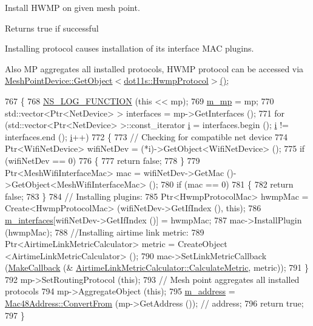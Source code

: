 Install H\+W\+MP on given mesh point. 

\begin{DoxyReturn}{Returns}
true if successful
\end{DoxyReturn}
Installing protocol causes installation of its interface M\+AC plugins.

Also MP aggregates all installed protocols, H\+W\+MP protocol can be accessed via \hyperlink{classns3_1_1Object_a13e18c00017096c8381eb651d5bd0783}{Mesh\+Point\+Device\+::\+Get\+Object$<$dot11s\+::\+Hwmp\+Protocol$>$()}; 
\begin{DoxyCode}
767 \{
768   \hyperlink{log-macros-disabled_8h_a90b90d5bad1f39cb1b64923ea94c0761}{NS\_LOG\_FUNCTION} (\textcolor{keyword}{this} << mp);
769   \hyperlink{classns3_1_1MeshL2RoutingProtocol_af4ebb2340b72dfc607ddf3c1ae65b54a}{m\_mp} = mp;
770   std::vector<Ptr<NetDevice> > interfaces = mp->GetInterfaces ();
771   \textcolor{keywordflow}{for} (std::vector<Ptr<NetDevice> >::const\_iterator \hyperlink{bernuolliDistribution_8m_a6f6ccfcf58b31cb6412107d9d5281426}{i} = interfaces.begin (); \hyperlink{bernuolliDistribution_8m_a6f6ccfcf58b31cb6412107d9d5281426}{i} != interfaces.end (); 
      \hyperlink{bernuolliDistribution_8m_a6f6ccfcf58b31cb6412107d9d5281426}{i}++)
772     \{
773       \textcolor{comment}{// Checking for compatible net device}
774       Ptr<WifiNetDevice> wifiNetDev = (*i)->GetObject<WifiNetDevice> ();
775       \textcolor{keywordflow}{if} (wifiNetDev == 0)
776         \{
777           \textcolor{keywordflow}{return} \textcolor{keyword}{false};
778         \}
779       Ptr<MeshWifiInterfaceMac>  mac = wifiNetDev->GetMac ()->GetObject<MeshWifiInterfaceMac> ();
780       \textcolor{keywordflow}{if} (mac == 0)
781         \{
782           \textcolor{keywordflow}{return} \textcolor{keyword}{false};
783         \}
784       \textcolor{comment}{// Installing plugins:}
785       Ptr<HwmpProtocolMac> hwmpMac = Create<HwmpProtocolMac> (wifiNetDev->GetIfIndex (), \textcolor{keyword}{this});
786       \hyperlink{classns3_1_1dot11s_1_1HwmpProtocol_ae2cee085d1d2b9d32b509b710c0b4511}{m\_interfaces}[wifiNetDev->GetIfIndex ()] = hwmpMac;
787       mac->InstallPlugin (hwmpMac);
788       \textcolor{comment}{//Installing airtime link metric:}
789       Ptr<AirtimeLinkMetricCalculator> metric = CreateObject <AirtimeLinkMetricCalculator> ();
790       mac->SetLinkMetricCallback (\hyperlink{group__makecallbackmemptr_ga9376283685aa99d204048d6a4b7610a4}{MakeCallback} (&
      \hyperlink{classns3_1_1dot11s_1_1AirtimeLinkMetricCalculator_a72c6cb74bc18c3d3faf86a1da79c9afd}{AirtimeLinkMetricCalculator::CalculateMetric}, metric));
791     \}
792   mp->SetRoutingProtocol (\textcolor{keyword}{this});
793   \textcolor{comment}{// Mesh point aggregates all installed protocols}
794   mp->AggregateObject (\textcolor{keyword}{this});
795   \hyperlink{classns3_1_1dot11s_1_1HwmpProtocol_abe24aa7305ec320810e4a0343ca9b25a}{m\_address} = \hyperlink{classns3_1_1Mac48Address_a911ce13603a9ef837545a032b6523ae4}{Mac48Address::ConvertFrom} (mp->GetAddress ()); \textcolor{comment}{// address;}
796   \textcolor{keywordflow}{return} \textcolor{keyword}{true};
797 \}
\end{DoxyCode}


